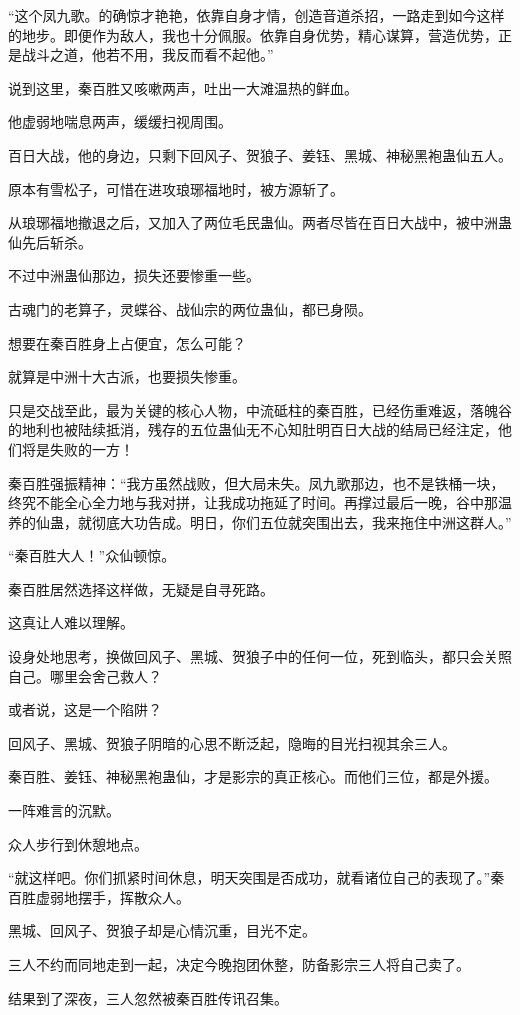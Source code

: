 \begin{this_body}
“这个凤九歌。的确惊才艳艳，依靠自身才情，创造音道杀招，一路走到如今这样的地步。即便作为敌人，我也十分佩服。依靠自身优势，精心谋算，营造优势，正是战斗之道，他若不用，我反而看不起他。”

说到这里，秦百胜又咳嗽两声，吐出一大滩温热的鲜血。

他虚弱地喘息两声，缓缓扫视周围。

百日大战，他的身边，只剩下回风子、贺狼子、姜钰、黑城、神秘黑袍蛊仙五人。

原本有雪松子，可惜在进攻琅琊福地时，被方源斩了。

从琅琊福地撤退之后，又加入了两位毛民蛊仙。两者尽皆在百日大战中，被中洲蛊仙先后斩杀。

不过中洲蛊仙那边，损失还要惨重一些。

古魂门的老算子，灵蝶谷、战仙宗的两位蛊仙，都已身陨。

想要在秦百胜身上占便宜，怎么可能？

就算是中洲十大古派，也要损失惨重。

只是交战至此，最为关键的核心人物，中流砥柱的秦百胜，已经伤重难返，落魄谷的地利也被陆续抵消，残存的五位蛊仙无不心知肚明百日大战的结局已经注定，他们将是失败的一方！

秦百胜强振精神：“我方虽然战败，但大局未失。凤九歌那边，也不是铁桶一块，终究不能全心全力地与我对拼，让我成功拖延了时间。再撑过最后一晚，谷中那温养的仙蛊，就彻底大功告成。明日，你们五位就突围出去，我来拖住中洲这群人。”

“秦百胜大人！”众仙顿惊。

秦百胜居然选择这样做，无疑是自寻死路。

这真让人难以理解。

设身处地思考，换做回风子、黑城、贺狼子中的任何一位，死到临头，都只会关照自己。哪里会舍己救人？

或者说，这是一个陷阱？

回风子、黑城、贺狼子阴暗的心思不断泛起，隐晦的目光扫视其余三人。

秦百胜、姜钰、神秘黑袍蛊仙，才是影宗的真正核心。而他们三位，都是外援。

一阵难言的沉默。

众人步行到休憩地点。

“就这样吧。你们抓紧时间休息，明天突围是否成功，就看诸位自己的表现了。”秦百胜虚弱地摆手，挥散众人。

黑城、回风子、贺狼子却是心情沉重，目光不定。

三人不约而同地走到一起，决定今晚抱团休整，防备影宗三人将自己卖了。

结果到了深夜，三人忽然被秦百胜传讯召集。

\end{this_body}

